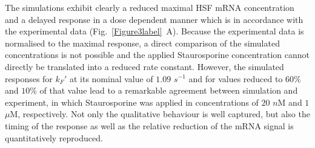 \documentclass[oneside, 10pt, a4paper, twocolumn]{article}
\begin{document}
The simulations exhibit clearly a reduced maximal HSF mRNA concentration and a delayed response in a dose dependent manner which is in accordance with the experimental data (Fig.~\ref{Figure3label}~A). 
Because the experimental data is normalised 
to the maximal response, a direct comparison of the simulated
concentrations is not possible and the applied Staurosporine
concentration cannot directly be translated into a reduced rate
constant.
However, the simulated responses for $k_F'$ at its nominal value of $1.09$ $s^{-1}$ and for values reduced to $60 \%$ and $10 \%$ of that value lead to a remarkable agreement
between simulation and experiment, in which Staurosporine was applied 
in concentrations of $20$ $n$M and $1$ $\mu$M, respectively.
Not only the qualitative behaviour is well captured, but also the
timing of the response as well as the relative reduction of the mRNA signal
is quantitatively reproduced.



\end{document}
